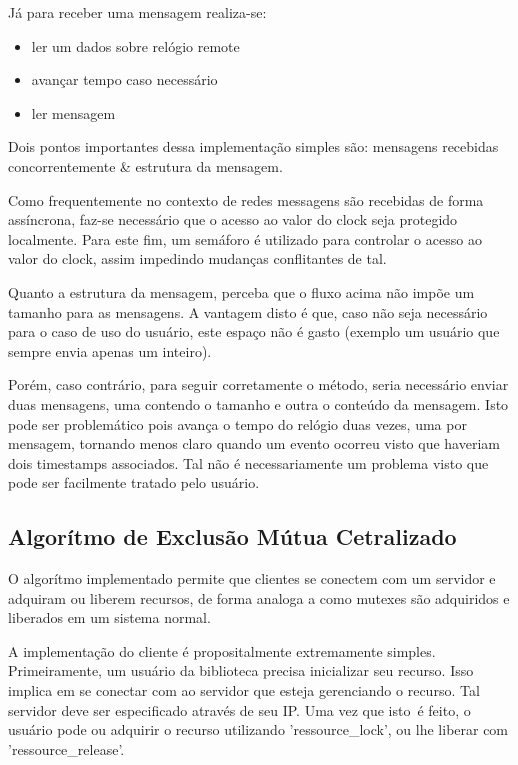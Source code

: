 \documentclass{article}
\begin{document}
Já para receber uma mensagem realiza-se: 
\begin{itemize}
  \item ler um dados sobre relógio remote
  \item avançar tempo caso necessário
  \item ler mensagem
\end{itemize}

Dois pontos importantes dessa implementação simples são: mensagens recebidas
concorrentemente \& estrutura da mensagem. 

Como frequentemente no contexto de redes messagens são recebidas de forma
assíncrona, faz-se necessário que o acesso ao valor do clock seja protegido
localmente. Para este fim, um semáforo é utilizado para controlar o acesso ao
valor do clock, assim impedindo mudanças conflitantes de tal. 

Quanto a estrutura da mensagem, perceba que o fluxo acima não impõe um tamanho
para as mensagens. A vantagem disto é que, caso não seja necessário para o caso
de uso do usuário, este espaço não é gasto (exemplo um usuário que sempre envia
apenas um inteiro).

Porém, caso contrário, para seguir corretamente o método, seria necessário
enviar duas mensagens, uma contendo o tamanho e outra o conteúdo da mensagem.
Isto pode ser problemático pois avança o tempo do relógio duas vezes, uma por
mensagem, tornando menos claro quando um evento ocorreu visto que haveriam dois
timestamps associados. Tal não é necessariamente um problema visto que pode ser
facilmente tratado pelo usuário. 

\subsection{Algorítmo de Exclusão Mútua Cetralizado}

O algorítmo implementado permite que clientes se conectem com um servidor e
adquiram ou liberem recursos, de forma analoga a como mutexes são adquiridos e
liberados em um sistema normal.

A implementação do cliente é propositalmente extremamente simples.
Primeiramente, um usuário da biblioteca precisa inicializar seu recurso. Isso
implica em se conectar com ao servidor que esteja gerenciando o recurso. Tal
servidor deve ser especificado através de seu IP. Uma vez que isto é feito, o
usuário pode ou adquirir o recurso utilizando 'ressource\_lock', ou lhe liberar
com 'ressource\_release'. 
\end{document}
